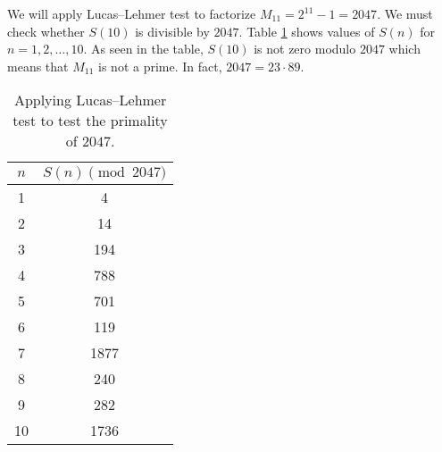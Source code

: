 \documentclass{subfiles}
\begin{document}
%			
	
		\begin{example}
			We will apply Lucas--Lehmer test to factorize $M_{11}=2^{11}-1=2047$. We must check whether $S(10)$ is divisible by $2047$. Table \ref{table:lucas-lehmer} shows values of $S(n)$ for $n=1,2,\ldots,10$. As seen in the table, $S(10)$ is not zero modulo $2047$ which means that $M_{11}$ is not a prime. In fact, $2047=23 \cdot 89$.
			\begin{table}
				\centering
				\begin{tabular}{|c|c|}
				\hline 
				$n$ & $S(n) \pmod {2047}$ \\ 
				\hline 
				1 & 4 \\ 
				\hline 
				2 & 14 \\ 
				\hline 
				3 & 194 \\ 
				\hline 
				4 & 788 \\ 
				\hline 
				5 & 701 \\ 
				\hline 
				6 & 119 \\ 
				\hline 
				7 & 1877 \\ 
				\hline 
				8 & 240 \\ 
				\hline 
				9 & 282 \\ 
				\hline 
				10 & 1736 \\ 
				\hline 
			\end{tabular} 
			\caption{Applying Lucas--Lehmer test to test the primality of $2047$.}
			\label{table:lucas-lehmer}
			\end{table}
		\end{example}
	
\end{document}
